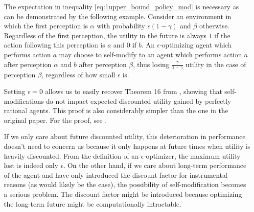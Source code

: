 The expectation in inequality \eqref{eq:1upper_bound_policy_mod} is necessary as can be demonstrated by the following example. Consider an environment in which the first perception is $\alpha$ with probability $\epsilon (1-\gamma)$ and $\beta$ otherwise. Regardless of the first perception, the utility in the future is always $1$ if the action following this perception is $a$ and $0$ if $b$. An $\epsilon$-optimizing agent which performs action $a$ may choose to self-modify to an agent which performs action $a$ after perception $\alpha$ and $b$ after perception $\beta$, thus losing $\frac{\gamma}{1-\gamma}$ utility in the case of perception $\beta$, regardless of how small $\epsilon$ is.

\smallskip \noindent
Setting $\epsilon=0$ allows us to easily recover Theorem 16 from \cite{everitt}, showing that self-modifications do not impact expected discounted utility gained by perfectly rational agents. This proof is also considerably simpler than the one in the original paper. For the proof, see . %

If we only care about future discounted utility, this deterioration in performance doesn't need to concern us because it only happens at future times when utility is heavily discounted. From the definition of an $\epsilon$-optimizer, the maximum utility lost is indeed only $\epsilon$. On the other hand, if we care about long-term performance of the agent and have only introduced the discount factor for instrumental reasons (as would likely be the case), the possibility of self-modification becomes a serious problem. The discount factor might be introduced because optimizing the long-term future might be computationally intractable.
